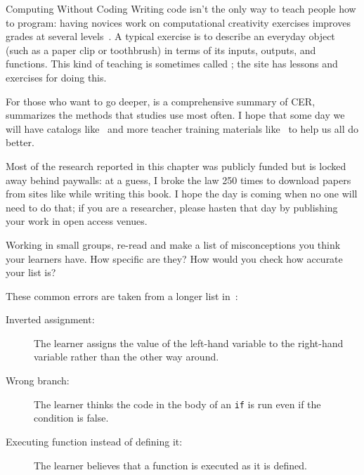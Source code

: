 \begin{aside}{Computing Without Coding}
  Writing code isn't the only way to teach people how to program:
  having novices work on computational creativity exercises improves grades at several levels~\cite{Shel2017}.
  A typical exercise is to describe an everyday object (such as a paper clip or toothbrush)
  in terms of its inputs, outputs, and functions.
  This kind of teaching is sometimes called ;
  the  site has lessons and exercises for doing this.
\end{aside}


For those who want to go deeper,
\cite{Finc2019} is a comprehensive summary of CER,
\cite{Ihan2016} summarizes the methods that studies use most often.
I hope that some day we will have catalogs like~\cite{Ojos2015}
and more teacher training materials like~\cite{Hazz2014,Guzd2015a,Sent2018}
to help us all do better.

Most of the research reported in this chapter was publicly funded
but is locked away behind paywalls:
at a guess,
I broke the law 250 times to download papers from sites like 
while writing this book.
I hope the day is coming when no one will need to do that;
if you are a researcher,
please hasten that day by publishing your work in open access venues.



Working in small groups,
re-read  and make a list of misconceptions you think your learners have.
How specific are they?
How would you check how accurate your list is?


These common errors are taken from a longer list in~\cite{Sirk2012}:

\begin{description}

\item[Inverted assignment:]
  The learner assigns the value of the left-hand variable to the right-hand variable
  rather than the other way around.

\item[Wrong branch:]
  The learner thinks the code in the body of an \texttt{if} is run
  even if the condition is false.

\item[Executing function instead of defining it:]
  The learner believes that a function is executed as it is defined.

\end{description}

